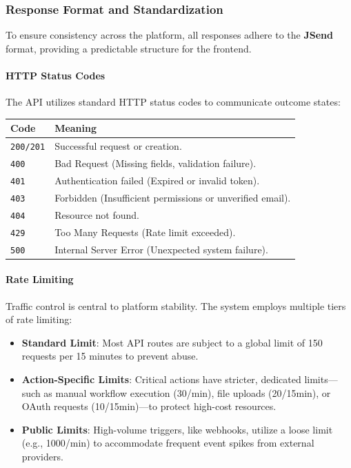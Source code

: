 \subsubsection{Response Format and Standardization}
To ensure consistency across the platform, all responses adhere to the \textbf{JSend} format, providing a predictable structure for the frontend.

\paragraph{HTTP Status Codes}
The API utilizes standard HTTP status codes to communicate outcome states:
\begin{table}[H]
\centering
\begin{tabular}{|l|p{8cm}|}
\hline
\textbf{Code} & \textbf{Meaning} \\
\hline
\texttt{200/201} & Successful request or creation. \\
\hline
\texttt{400} & Bad Request (Missing fields, validation failure). \\
\hline
\texttt{401} & Authentication failed (Expired or invalid token). \\
\hline
\texttt{403} & Forbidden (Insufficient permissions or unverified email). \\
\hline
\texttt{404} & Resource not found. \\
\hline
\texttt{429} & Too Many Requests (Rate limit exceeded). \\
\hline
\texttt{500} & Internal Server Error (Unexpected system failure). \\
\hline
\end{tabular}
\end{table}

\paragraph{Rate Limiting}
Traffic control is central to platform stability. The system employs multiple tiers of rate limiting:
\begin{itemize}
    \item \textbf{Standard Limit}: Most API routes are subject to a global limit of 150 requests per 15 minutes to prevent abuse.
    \item \textbf{Action-Specific Limits}: Critical actions have stricter, dedicated limits—such as manual workflow execution (30/min), file uploads (20/15min), or OAuth requests (10/15min)—to protect high-cost resources.
    \item \textbf{Public Limits}: High-volume triggers, like webhooks, utilize a loose limit (e.g., 1000/min) to accommodate frequent event spikes from external providers.
\end{itemize}

